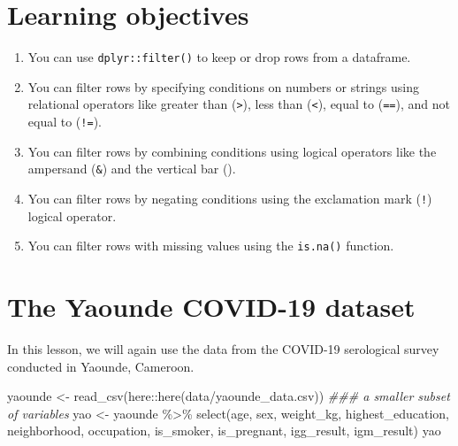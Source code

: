 \documentclass[
  letterpaper,
  DIV=11,
  numbers=noendperiod]{scrreprt}
\newenvironment{Shaded}{\begin{snugshade}}{\end{snugshade}}
\newcommand{\DocumentationTok}[1]{\textcolor[rgb]{0.37,0.37,0.37}{\textit{#1}}}
\newcommand{\FunctionTok}[1]{\textcolor[rgb]{0.28,0.35,0.67}{#1}}
\newcommand{\NormalTok}[1]{\textcolor[rgb]{0.00,0.23,0.31}{#1}}
\newcommand{\OtherTok}[1]{\textcolor[rgb]{0.00,0.23,0.31}{#1}}
\newcommand{\SpecialCharTok}[1]{\textcolor[rgb]{0.37,0.37,0.37}{#1}}
\newcommand{\StringTok}[1]{\textcolor[rgb]{0.13,0.47,0.30}{#1}}
\begin{document}
\hypertarget{learning-objectives-7}{%
\section{Learning objectives}\label{learning-objectives-7}}

\begin{enumerate}
\def\labelenumi{\arabic{enumi}.}
\item
  You can use \texttt{dplyr::filter()} to keep or drop rows from a
  dataframe.\\
\item
  You can filter rows by specifying conditions on numbers or strings
  using relational operators like greater than
  (\texttt{\textgreater{}}), less than (\texttt{\textless{}}), equal to
  (\texttt{==}), and not equal to (\texttt{!=}).
\item
  You can filter rows by combining conditions using logical operators
  like the ampersand (\texttt{\&}) and the vertical bar
  (\texttt{\textbar{}}).
\item
  You can filter rows by negating conditions using the exclamation mark
  (\texttt{!}) logical operator.\\
\item
  You can filter rows with missing values using the \texttt{is.na()}
  function.
\end{enumerate}

\hypertarget{the-yaounde-covid-19-dataset-1}{%
\section{The Yaounde COVID-19
dataset}\label{the-yaounde-covid-19-dataset-1}}

In this lesson, we will again use the data from the COVID-19 serological
survey conducted in Yaounde, Cameroon.

\begin{Shaded}
\begin{Highlighting}[]
\NormalTok{yaounde }\OtherTok{\textless{}{-}} \FunctionTok{read\_csv}\NormalTok{(here}\SpecialCharTok{::}\FunctionTok{here}\NormalTok{(}\StringTok{\textquotesingle{}data/yaounde\_data.csv\textquotesingle{}}\NormalTok{))}
\DocumentationTok{\#\#\# a smaller subset of variables}
\NormalTok{yao }\OtherTok{\textless{}{-}}\NormalTok{ yaounde }\SpecialCharTok{\%\textgreater{}\%} 
  \FunctionTok{select}\NormalTok{(age, sex, weight\_kg, highest\_education, neighborhood, }
\NormalTok{         occupation, is\_smoker, is\_pregnant, }
\NormalTok{         igg\_result, igm\_result)}
\NormalTok{yao}
\end{Highlighting}
\end{Shaded}
\end{document}
